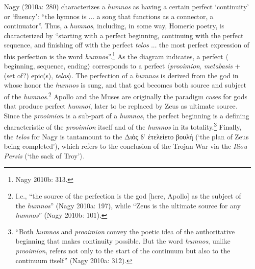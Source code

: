 \documentclass[12pt]{article}
\begin{document}
Nagy (2010a: 280) characterizes a \textit{humnos} as having a certain perfect `continuity' or `fluency': ``the hymnos is ... a song that functions as a connector, a continuator''. Thus, a \textit{humnos}, including, in some way, Homeric poetry, is characterized by ``starting with a perfect beginning, continuing with the perfect sequence, and finishing off with the perfect \textit{telos} ...  the most perfect expression of this perfection is the word \textit{humnos}''.\footnote{ Nagy 2010b: 313.} As the diagram indicates, a perfect $\langle$beginning, sequence, ending$\rangle$ corresponds to a perfect $\langle$\textit{prooimion}, \textit{metabasis} + (set of?) epic(s), \textit{telos}$\rangle$. The perfection of a \textit{humnos} is derived from the god in whose honor the \textit{humnos} is sung, and that god becomes both source and subject of the \textit{humnos}.\footnote{ I.e., ``the source of the perfection is the god [here, Apollo] as the subject of the \textit{humnos}'' (Nagy 2010a: 197), while ``Zeus is the ultimate source for any \textit{humnos}'' (Nagy 2010b: 101).} Apollo and the Muses are originally the paradigm cases for gods that produce perfect \textit{humnoi}, later to be replaced by Zeus as ultimate source. Since the \textit{prooimion} is a sub-part of a \textit{humnos}, the perfect beginning is a defining characteristic of the \textit{prooimion} itself and of the \textit{humnos} in its totality.\footnote{ ``Both \textit{humnos} and \textit{prooimion} convey the poetic idea of the authoritative  beginning that makes continuity possible. But the word \textit{humnos}, unlike \textit{prooimion}, refers not only to the start of the continuum but also to the continuum itself'' (Nagy 2010a: 312).} Finally, the \textit{telos} for Nagy is tantamount to the Διὸς δ’ ἐτελείετο βουλή (`the plan of Zeus being completed'), which refers to the conclusion of the Trojan War via the \textit{Iliou Persis} (`the sack of Troy').
\end{document}
